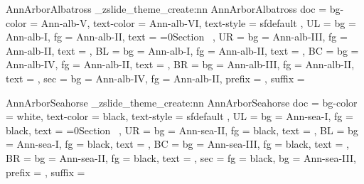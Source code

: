 {  %
  {AnnArborAlbatross}{
    \_zslide_theme_create:nn {AnnArborAlbatross}{
      doc = {
        bg-color = Ann-alb-V,
        text-color = Ann-alb-VI,
        text-style = sfdefault
      },
      UL = {
        bg   = Ann-alb-I,
        fg   = Ann-alb-II, 
        text = {\ifnum{}=0\else Section\ \thesection\fi} 
      },
      UR = {
        bg   = Ann-alb-III,
        fg   = Ann-alb-II,
        text = {\zslideDefaultUR}
      },
      BL = {
        bg   = Ann-alb-I,
        fg   = Ann-alb-II,
        text = \zslideAuthor
      },
      BC = {
        bg   = Ann-alb-IV,
        fg   = Ann-alb-II,
        text = \zslideTitle
      },
      BR = {
        bg   = Ann-alb-III,
        fg   = Ann-alb-II,
        text = \zslideDefaultBR 
      },
      sec = {
        bg   = Ann-alb-IV,
        fg   = Ann-alb-II,
        prefix = {},
        suffix = {}
      }
    }
  }

  {AnnArborSeahorse}{
    \_zslide_theme_create:nn {AnnArborSeahorse}{
      doc = {
        bg-color = white,
        text-color = black,
        text-style = sfdefault
      },
      UL = {
        bg   = Ann-sea-I,
        fg   = black,
        text = {\ifnum{}=0\else Section\ \thesection\fi}
      },
      UR = {
        bg   = Ann-sea-II,
        fg   = black,
        text = {\zslideDefaultUR}
      },
      BL = {
        bg   = Ann-sea-I,
        fg   = black,
        text = \zslideAuthor
      },
      BC = {
        bg   = Ann-sea-III,
        fg   = black,
        text = \zslideTitle
      },
      BR = {
        bg   = Ann-sea-II,
        fg   = black,
        text = \zslideDefaultBR
      },
      sec = {
        fg   = black,
        bg   = Ann-sea-III,
        prefix = {},
        suffix = {}
      }
    }
  }

}
